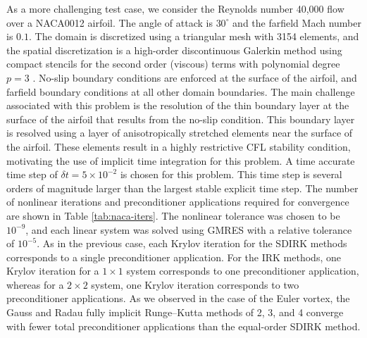\documentclass[review]{siamart}
\begin{document}
As a more challenging test case, we consider the Reynolds number 40{,}000 flow
over a NACA0012 airfoil. The angle of attack is $30^\circ$ and the farfield Mach
number is $0.1$. The domain is discretized using a triangular mesh with 3154
elements, and the spatial discretization is a high-order discontinuous Galerkin
method using compact stencils for the second order (viscous) terms with
polynomial degree $p=3$ \cite{Peraire2008}. No-slip boundary conditions are
enforced at the surface of the airfoil, and farfield boundary conditions at all
other domain boundaries. The main challenge associated with this problem is the
resolution of the thin boundary layer at the surface of the airfoil that results
from the no-slip condition. This boundary layer is resolved using a layer of
anisotropically stretched elements near the surface of the airfoil. These
elements result in a highly restrictive CFL stability condition, motivating the
use of implicit time integration for this problem. A time accurate time step of
$\delta t = 5 \times 10^{-2}$ is chosen for this problem. This time step is
several orders of magnitude larger than the largest stable explicit time step.
The number of nonlinear iterations and preconditioner applications required for
convergence are shown in Table \ref{tab:naca-iters}. The nonlinear tolerance was
chosen to be $10^{-9}$, and each linear system was solved using GMRES with a
relative tolerance of $10^{-5}$. As in the previous case, each Krylov iteration
for the SDIRK methods corresponds to a single preconditioner application. For
the IRK methods, one Krylov iteration for a $1\times1$ system corresponds to one
preconditioner application, whereas for a $2\times2$ system, one Krylov
iteration corresponds to two preconditioner applications. As we observed in the
case of the Euler vortex, the Gauss and Radau fully implicit Runge--Kutta
methods of 2, 3, and 4 converge with fewer total preconditioner applications
than the equal-order SDIRK method.
\end{document}

